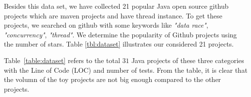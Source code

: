 Besides this data set, we have collected 21 popular Java open source github
projects which are maven projects and have thread instance. To
get these projects, we searched on github with some keywords like \textit{"data
race"}, \textit{"concurrency"}, \textit{"thread"}. We determine the popularity of Github projects using the number of stars. Table \ref{tbl:dataset}
illustrates our considered 21 projects. 


Table~\ref{table:dataset} refers to the total $31$ Java projects of these three categories with the Line of Code (LOC) and number of tests. From the table, it is clear that the volumn of the toy projects are not big enough compared to the other projects.  


